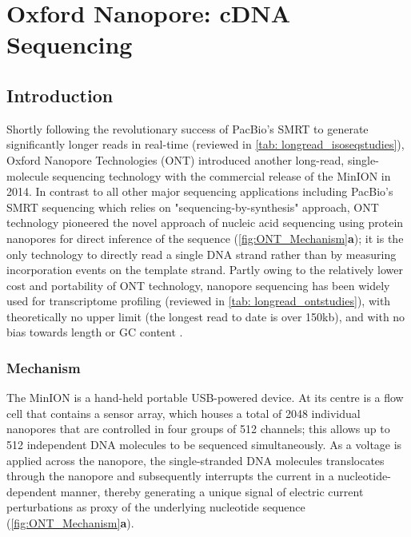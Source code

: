 \clearpage

\section{Oxford Nanopore: cDNA Sequencing}
\label{sec:ONT_cDNA_Sequencing}

\subsection{Introduction}
Shortly following the revolutionary success of PacBio's SMRT to generate significantly longer reads in real-time (reviewed in \cref{tab: longread_isoseqstudies}), Oxford Nanopore Technologies (ONT) introduced another long-read, single-molecule sequencing technology with the commercial release of the MinION in 2014. In contrast to all other major sequencing applications including PacBio's SMRT sequencing which relies on "sequencing-by-synthesis" approach, ONT technology pioneered the novel approach of nucleic acid sequencing using protein nanopores for direct inference of the sequence (\cref{fig:ONT_Mechanism}\textbf{a}); it is the only technology to directly read a single DNA strand rather than by measuring incorporation events on the template strand\cite{Jain2015}. Partly owing to the relatively lower cost and portability of ONT technology, nanopore sequencing has been widely used for transcriptome profiling (reviewed in \cref{tab: longread_ontstudies}), 
with theoretically no upper limit \cite{Loman2015} (the longest read to date is over 150kb), and with no bias towards length or GC content \cite{Oikonomopoulos2016, Weirather2017}.


\subsubsection{Mechanism}
The MinION is a hand-held portable USB-powered device. At its centre is a flow cell that contains a sensor array, which houses a total of 2048 individual nanopores that are controlled in four groups of 512 channels; this allows up to 512 independent DNA molecules to be sequenced simultaneously\cite{Jain2015}. As a voltage is applied across the nanopore, the single-stranded DNA molecules translocates through the nanopore and subsequently interrupts the current in a nucleotide-dependent manner, thereby generating a unique signal of electric current perturbations as proxy of the underlying nucleotide sequence (\cref{fig:ONT_Mechanism}\textbf{a}). 

